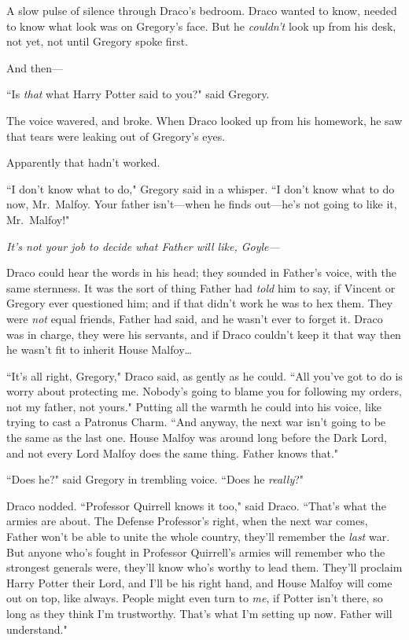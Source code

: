 A slow pulse of silence through Draco's bedroom. Draco wanted to know, needed to know what look was on Gregory's face. But he \emph{couldn't} look up from his desk, not yet, not until Gregory spoke first.

And then—

``Is \emph{that} what Harry Potter said to you?" said Gregory.

The voice wavered, and broke. When Draco looked up from his homework, he saw that tears were leaking out of Gregory's eyes.

Apparently that hadn't worked.

``I don't know what to do," Gregory said in a whisper. ``I don't know what to do now, Mr.~Malfoy. Your father isn't—when he finds out—he's not going to like it, Mr.~Malfoy!"

\emph{It's not \emph{your} job to decide what Father will like, Goyle—}

Draco could hear the words in his head; they sounded in Father's voice, with the same sternness. It was the sort of thing Father had \emph{told} him to say, if Vincent or Gregory ever questioned him; and if that didn't work he was to hex them. They were \emph{not} equal friends, Father had said, and he wasn't ever to forget it. Draco was in charge, they were his servants, and if Draco couldn't keep it that way then he wasn't fit to inherit House Malfoy{\ldots}

``It's all right, Gregory," Draco said, as gently as he could. ``All you've got to do is worry about protecting me. Nobody's going to blame you for following my orders, not my father, not yours." Putting all the warmth he could into his voice, like trying to cast a Patronus Charm. ``And anyway, the next war isn't going to be the same as the last one. House Malfoy was around long before the Dark Lord, and not every Lord Malfoy does the same thing. Father knows that."

``Does he?" said Gregory in trembling voice. ``Does he \emph{really}?"

Draco nodded. ``Professor Quirrell knows it too," said Draco. ``That's what the armies are about. The Defense Professor's right, when the next war comes, Father won't be able to unite the whole country, they'll remember the \emph{last} war. But anyone who's fought in Professor Quirrell's armies will remember who the strongest generals were, they'll know who's worthy to lead them. They'll proclaim Harry Potter their Lord, and I'll be his right hand, and House Malfoy will come out on top, like always. People might even turn to \emph{me}, if Potter isn't there, so long as they think I'm trustworthy. That's what I'm setting up now. Father will understand."

